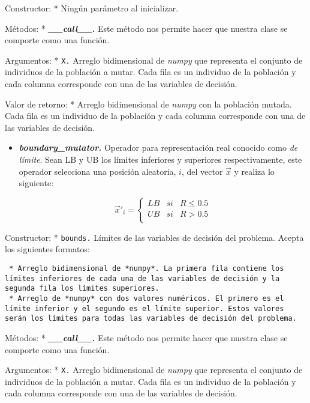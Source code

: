 \documentclass[11pt]{article}
\providecommand{\tightlist}{%
      \setlength{\itemsep}{0pt}\setlength{\parskip}{0pt}}
\begin{document}
Constructor: * Ningún parámetro al inicializar.

Métodos: * \emph{\textbf{\_\_call\_\_.}} Este método nos permite hacer
que nuestra clase se comporte como una función.

Argumentos: * \texttt{X.} Arreglo bidimensional de \emph{numpy} que
representa el conjunto de individuos de la población a mutar. Cada fila
es un individuo de la población y cada columna corresponde con una de
las variables de decisión.

Valor de retorno: * Arreglo bidimensional de \emph{numpy} con la
población mutada. Cada fila es un individuo de la población y cada
columna corresponde con una de las variables de decisión.

    \begin{itemize}
\tightlist
\item
  \emph{\textbf{boundary\_mutator.}} Operador para representación real
  conocido como \emph{de límite}. Sean LB y UB los límites inferiores y
  superiores respectivamente, este operador selecciona una posición
  aleatoria, \(i\), del vector \(\vec{x}\) y realiza lo siguiente:

  \begin{equation}
  \vec{x}'_{i} = 
    \begin{cases}
     LB & si & R \le 0.5 \\
     UB & si & R > 0.5 \\
    \end{cases}
  \end{equation}
\end{itemize}

Constructor: * \texttt{bounds.} Límites de las variables de decisión del
problema. Acepta los siguientes formatos:

\begin{verbatim}
 * Arreglo bidimensional de *numpy*. La primera fila contiene los límites inferiores de cada una de las variables de decisión y la segunda fila los límites superiores.
 * Arreglo de *numpy* con dos valores numéricos. El primero es el límite inferior y el segundo es el límite superior. Estos valores serán los límites para todas las variables de decisión del problema.
\end{verbatim}

Métodos: * \emph{\textbf{\_\_call\_\_.}} Este método nos permite hacer
que nuestra clase se comporte como una función.

Argumentos: * \texttt{X.} Arreglo bidimensional de \emph{numpy} que
representa el conjunto de individuos de la población a mutar. Cada fila
es un individuo de la población y cada columna corresponde con una de
las variables de decisión.
\end{document}

